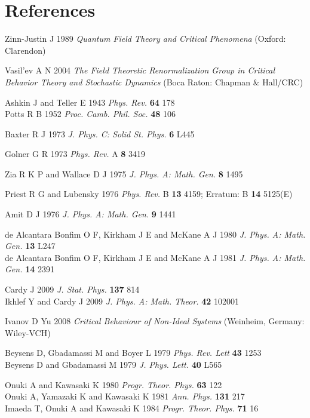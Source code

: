 \documentclass[12pt]{iopart}
\begin{document}
\section*{References}
\begin{thebibliography}{99}

 Zinn-Justin J 1989 {\it Quantum Field Theory and Critical
Phenomena} (Oxford: Clarendon)

 Vasil'ev A N 2004 {\it The Field Theoretic Renormalization
Group in Critical Behavior Theory and Stochastic Dynamics}
(Boca Raton: Chapman \& Hall/CRC)


 Ashkin J and Teller E 1943 {\it Phys. Rev.} {\bf 64} 178 \\
Potts R B 1952 {\it Proc. Camb. Phil. Soc.} {\bf 48} 106

 Baxter R J 1973 {\it J. Phys. C: Solid St. Phys.}
{\bf 6} L445

 Golner G R 1973 {\it Phys. Rev.} A {\bf 8} 3419

 Zia R K P and Wallace D J 1975 {\it J. Phys. A: Math. Gen.}
{\bf 8} 1495

 Priest R G and Lubensky 1976 {\it Phys. Rev.} B {\bf 13}
4159; Erratum: B {\bf 14} 5125(E)

 Amit D J 1976 {\it J. Phys. A: Math. Gen.} {\bf 9} 1441

 de Alcantara Bonfim O F, Kirkham J E and  McKane A J
1980 {\it J. Phys. A: Math. Gen.} {\bf 13} L247 \\
de Alcantara Bonfim O F, Kirkham J E and  McKane A J
1981 {\it J. Phys. A: Math. Gen.} {\bf 14} 2391

 Cardy J 2009 {\it J. Stat. Phys.} {\bf 137} 814 \\
Ikhlef Y and Cardy J 2009 {\it J. Phys. A: Math. Theor.} {\bf 42} 102001

 Ivanov D Yu 2008 {\it Critical Behaviour of
Non-Ideal Systems} (Weinheim, Germany: Wiley-VCH)

 Beysens D, Gbadamassi M and Boyer L 1979
{\it Phys. Rev. Lett} {\bf 43} 1253 \\
Beysens D and Gbadamassi M 1979 {\it J. Phys. Lett.} {\bf 40} L565

 Onuki A and Kawasaki K 1980 {\it Progr. Theor. Phys.}
{\bf 63} 122 \\
Onuki A, Yamazaki K and Kawasaki K 1981 {\it Ann. Phys.} {\bf 131} 217 \\
Imaeda T, Onuki A and Kawasaki K 1984 {\it Progr. Theor. Phys.} {\bf 71} 16


\end{thebibliography}
\end{document}
